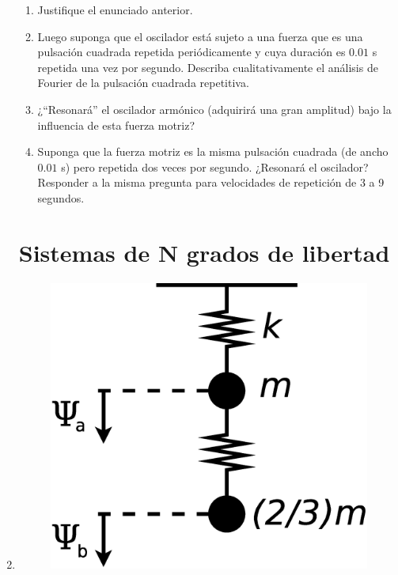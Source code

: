 \documentclass[11pt,spanish,a4paper]{article}
\begin{document}
\begin{enumerate}
\begin{enumerate}
\item Justifique el enunciado anterior. 
\item Luego suponga que el oscilador está sujeto a una fuerza que es una
pulsación cuadrada repetida periódicamente y cuya duración es $0.01$
s repetida una vez por segundo. Describa cualitativamente el análisis
de Fourier de la pulsación cuadrada repetitiva. 
\item ¿``Resonará'' el oscilador armónico (adquirirá una gran amplitud)
bajo la influencia de esta fuerza motriz? 
\item Suponga que la fuerza motriz es la misma pulsación cuadrada (de ancho
$0.01$ s) pero repetida dos veces por segundo. ¿Resonará el oscilador?
Responder a la misma pregunta para velocidades de repetición de 3
a 9 segundos.
\end{enumerate}


\section*{Sistemas de N grados de libertad}

\item \qquad{}
\begin{figure}[H]
\centering{}\includegraphics[clip,scale=0.25]{ej1-6}
\end{figure}




\end{enumerate}
\end{document}
